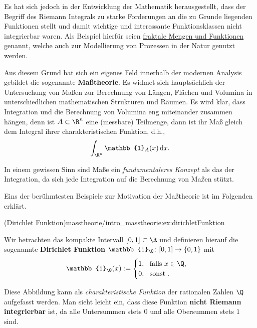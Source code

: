 \documentclass[letterpaper,10pt,english]{jupyterBook}
\begin{document}
\par
Es hat sich jedoch in der Entwicklung der Mathematik herausgestellt, dass der Begriff des Riemann Integrals zu starke Forderungen an die zu Grunde liegenden Funktionen stellt und damit wichtige und interessante Funktionsklassen nicht integrierbar waren.
Als Beispiel hierfür seien \href{https://de.wikipedia.org/wiki/Fraktal}{fraktale Mengen und Funktionen} genannt, welche auch zur Modellierung von Prozessen in der Natur genutzt werden.

\par
Aus diesem Grund hat sich ein eigenes Feld innerhalb der modernen Analysis gebildet   die sogenannte \textbf{Maßtheorie}.
Es widmet sich hauptsächlich der Untersuchung von Maßen zur Berechnung von Längen, Flächen und Volumina in unterschiedlichen mathematischen Strukturen und Räumen.
Es wird klar, dass Integration und die Berechnung von Volumina eng miteinander zusammen hängen, denn ist \(A\subset\R^n\) eine (messbare) Teilmenge, dann ist ihr Maß gleich dem Integral ihrer charakteristischen Funktion, d.h.,
\begin{align*}
\int_{\R^n} \mathbb{1}_A(x)\,\mathrm{d}x.
\end{align*}
\par
In einem gewissen Sinn sind Maße ein \emph{fundamentaleres Konzept} als das der Integration, da sich jede Integration auf die Berechnung von Maßen stützt.

\par
Eins der berühmtesten Beispiele zur Motivation der Maßtheorie ist im Folgenden erklärt.
\begin{example}{(Dirichlet Funktion)}{masstheorie/intro_masstheorie:ex:dirichletFunktion}



\par
Wir betrachten das kompakte Intervall \([0,1] \subset \R\) und definieren hierauf die sogenannte \textbf{Dirichlet Funktion} \(\mathbb{1}_\Q \colon [0,1] \rightarrow \{0,1\}\) mit
\begin{align*}
\mathbb{1}_\Q(x) := \begin{cases} 1, \ \text{ falls } x \in \Q, \\ 0, \ \text{ sonst }.\end{cases}
\end{align*}
\par
Diese Abbildung kann als \emph{charakteristische Funktion} der rationalen Zahlen \(\Q\) aufgefasst werden.
Man sieht leicht ein, dass diese Funktion \textbf{nicht Riemann integrierbar} ist, da alle Untersummen stets \(0\) und alle Obersummen stets \(1\) sind.
\end{example}
\end{document}
